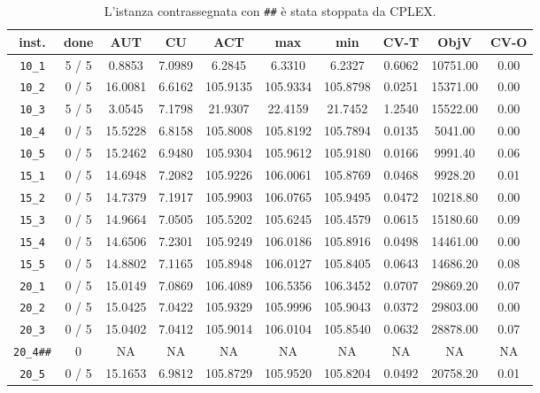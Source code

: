 \begin{table}[h!]
\begin{center}
\small
\begin{tabular}{| c | c | c | c | c | c | c | c | c | c |}
\hline
inst. & done & AUT & CU & ACT & max & min & CV-T & ObjV & CV-O \\
\hline
\verb|10_1| & 5 / 5 & 0.8853 & 7.0989 & 6.2845 & 6.3310 & 6.2327 & 0.6062 & 10751.00 & 0.00\\ 
\verb|10_2| & 0 / 5 & 16.0081 & 6.6162 & 105.9135 & 105.9334 & 105.8798 & 0.0251 & 15371.00 & 0.00\\ 
\verb|10_3| & 5 / 5 & 3.0545 & 7.1798 & 21.9307 & 22.4159 & 21.7452 & 1.2540 & 15522.00 & 0.00\\ 
\verb|10_4| & 0 / 5 & 15.5228 & 6.8158 & 105.8008 & 105.8192 & 105.7894 & 0.0135 & 5041.00 & 0.00\\ 
\verb|10_5| & 0 / 5 & 15.2462 & 6.9480 & 105.9304 & 105.9612 & 105.9180 & 0.0166 & 9991.40 & 0.06\\ 
\verb|15_1| & 0 / 5 & 14.6948 & 7.2082 & 105.9226 & 106.0061 & 105.8769 & 0.0468 & 9928.20 & 0.01\\ 
\verb|15_2| & 0 / 5 & 14.7379 & 7.1917 & 105.9903 & 106.0765 & 105.9495 & 0.0472 & 10218.80 & 0.00\\ 
\verb|15_3| & 0 / 5 & 14.9664 & 7.0505 & 105.5202 & 105.6245 & 105.4579 & 0.0615 & 15180.60 & 0.09\\ 
\verb|15_4| & 0 / 5 & 14.6506 & 7.2301 & 105.9249 & 106.0186 & 105.8916 & 0.0498 & 14461.00 & 0.00\\ 
\verb|15_5| & 0 / 5 & 14.8802 & 7.1165 & 105.8948 & 106.0127 & 105.8405 & 0.0643 & 14686.20 & 0.08\\ 
\verb|20_1| & 0 / 5 & 15.0149 & 7.0869 & 106.4089 & 106.5356 & 106.3452 & 0.0707 & 29869.20 & 0.07\\ 
\verb|20_2| & 0 / 5 & 15.0425 & 7.0422 & 105.9329 & 105.9996 & 105.9043 & 0.0372 & 29803.00 & 0.00\\ 
\verb|20_3| & 0 / 5 & 15.0402 & 7.0412 & 105.9014 & 106.0104 & 105.8540 & 0.0632 & 28878.00 & 0.07\\ 
\verb|20_4##| & 0 & NA & NA & NA & NA & NA & NA & NA & NA \\ 
\verb|20_5| & 0 / 5 & 15.1653 & 6.9812 & 105.8729 & 105.9520 & 105.8204 & 0.0492 & 20758.20 & 0.01\\ 
\hline
\end{tabular}
\caption{L'istanza contrassegnata con \texttt{\#\#} è stata stoppata da CPLEX.}
\label{table:hull:10}
\end{center}
\end{table}

